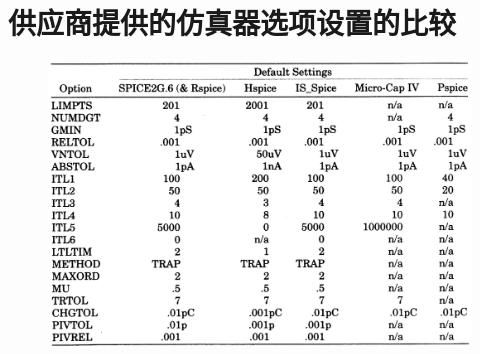 \chapter{供应商提供的仿真器选项设置的比较}
\label{appendix-A}

\begin{figure}[htbp]
\small
    \centering
    \includegraphics[width=\textwidth]{figure/Appendix-A/比较.png}
\end{figure}
